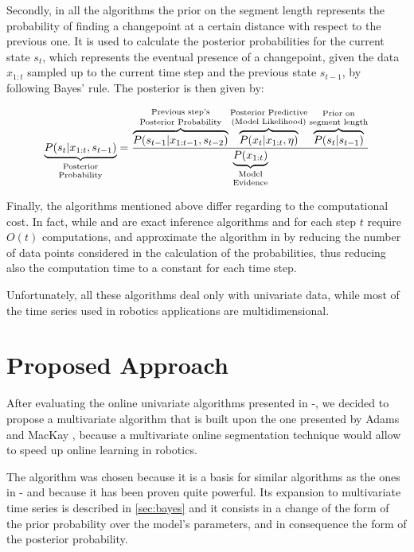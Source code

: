 \documentclass[11pt,twoside,a4paper]{report}
\begin{document}
Secondly, in all the algorithms the prior on the segment length represents the probability of finding a changepoint at a certain distance with respect to the previous one. It is used to calculate the posterior probabilities for the current state $s_t$, which represents the eventual presence of a changepoint, given the data $x_{1:t}$ sampled up to the current time step and the previous state $s_{t-1}$, by following Bayes' rule. The posterior is then given by:

\begin{equation} \label{eq:post}
\underbrace{P(s_t | x_{1:t}, s_{t-1})}_{\text{\shortstack{Posterior \\ Probability}}} = \frac{\overbrace{P(s_{t-1} | x_{1:t-1}, s_{t-2})}^{\text{\shortstack{Previous step's \\Posterior Probability}}}\overbrace{P(x_t | x_{1:t}, \eta)}^{\text{\shortstack{Posterior Predictive\\(Model Likelihood)}}}  \overbrace{P(s_t | s_{t - 1})}^{\text{\shortstack{Prior on\\segment length}}}}{  \underbrace{P (x_{1:t}) }_{\text{\shortstack{Model \\ Evidence}}}}
\end{equation}

Finally, the algorithms mentioned above differ regarding to the computational cost. In fact, while \cite{adams} and \cite{fearn1} are exact inference algorithms and for each step $t$ require $O(t)$ computations, \cite{fearn2} and \cite{champ} approximate the algorithm in \cite{fearn1} by reducing the number of data points considered in the calculation of the probabilities, thus reducing also the computation time to a constant for each time step.

Unfortunately, all these algorithms deal only with univariate data, while most of the time series used in robotics applications are multidimensional.

\section{Proposed Approach}
After evaluating the online univariate algorithms presented in \cite{adams}-\cite{champ}, we decided to propose a multivariate algorithm that is built upon the one presented by Adams and MacKay \cite{adams}, because a multivariate online segmentation technique would allow to speed up online learning in robotics.

The algorithm was chosen because it is a basis for similar algorithms as the ones in \cite{fearn1}-\cite{champ} and because it has been proven quite powerful. Its expansion to multivariate time series is described in \ref{sec:bayes} and it consists in a change of the form of the prior probability over the model's parameters, and in consequence the form of the posterior probability.
\end{document}
